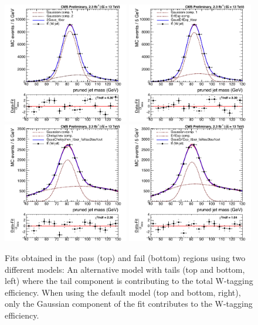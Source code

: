 \begin{figure}[ht!]
  \centering
    \includegraphics[width=0.49\textwidth]{figures/vtagging/AN-16-215/2Gauss.pdf}
    \includegraphics[width=0.49\textwidth]{figures/vtagging/AN-16-215/GausErfExpPass.pdf}\\
    \includegraphics[width=0.49\textwidth]{figures/vtagging/AN-16-215/GausChebysgev.pdf}
    \includegraphics[width=0.49\textwidth]{figures/vtagging/AN-16-215/GausErfExpFail.pdf}
  \caption{Fits obtained in the pass (top) and fail (bottom) regions using two different models: An alternative model with tails (top and bottom, left) where the tail component is contributing to the total W-tagging efficiency. When using the default model (top and bottom, right), only the Gaussian component of the fit contributes to the W-tagging efficiency.}
  \label{fig:searchII:gausvstails}
\end{figure} 
